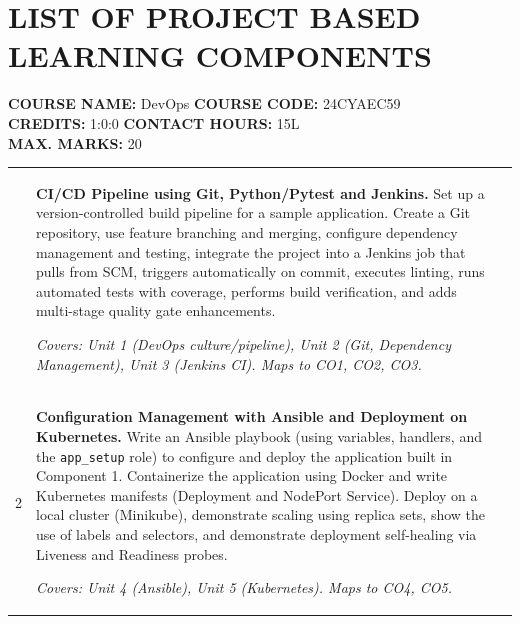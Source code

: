\documentclass[12pt,a4paper]{article}
\newcommand{\sizeTwelve}{\fontsize{12pt}{14.5pt}\selectfont}  %
\begin{document}
\section*{LIST OF PROJECT BASED LEARNING COMPONENTS}

\noindent
{\sizeTwelve
\textbf{COURSE NAME:} DevOps \hfill \textbf{COURSE CODE:} 24CYAEC59 \\
\textbf{CREDITS:} 1:0:0 \hfill \textbf{CONTACT HOURS:} 15L \\
\textbf{MAX. MARKS:} 20
\par}

\vspace{0.6cm}

{\sizeTwelve
\setlength{\tabcolsep}{4pt}
\renewcommand{\arraystretch}{1.25}
\begin{longtable}{|>{\centering\arraybackslash}m{1.2cm}|>{\raggedright\arraybackslash}p{10.6cm}|>{\centering\arraybackslash}m{1.8cm}|}
\hline
\multicolumn{1}{|c|}{\textbf{Sl. No}} &
\multicolumn{1}{c|}{\textbf{Description}} &
\multicolumn{1}{c|}{\textbf{Marks}} \\
\hline
\endhead

1 &
\textbf{CI/CD Pipeline using Git, Python/Pytest and Jenkins.}
Set up a version-controlled build pipeline for a sample application. Create a Git repository, use feature branching and merging, configure dependency management and testing, integrate the project into a Jenkins job that pulls from SCM, triggers automatically on commit, executes linting, runs automated tests with coverage, performs build verification, and adds multi-stage quality gate enhancements.

\textit{Covers: Unit 1 (DevOps culture/pipeline), Unit 2 (Git, Dependency Management), Unit 3 (Jenkins CI). Maps to CO1, CO2, CO3.}
& 10 \\
\hline

2 &
\textbf{Configuration Management with Ansible and Deployment on Kubernetes.}
Write an Ansible playbook (using variables, handlers, and the \texttt{app\_setup} role) to configure and deploy the application built in Component 1. Containerize the application using Docker and write Kubernetes manifests (Deployment and NodePort Service). Deploy on a local cluster (Minikube), demonstrate scaling using replica sets, show the use of labels and selectors, and demonstrate deployment self-healing via Liveness and Readiness probes.

\textit{Covers: Unit 4 (Ansible), Unit 5 (Kubernetes). Maps to CO4, CO5.}
& 10 \\
\hline

\end{longtable}
\par}
\end{document}
